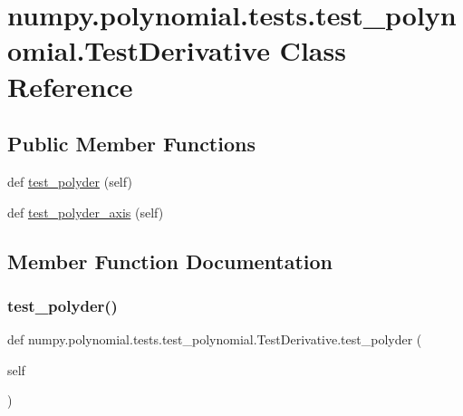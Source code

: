 \hypertarget{classnumpy_1_1polynomial_1_1tests_1_1test__polynomial_1_1TestDerivative}{}\section{numpy.\+polynomial.\+tests.\+test\+\_\+polynomial.\+Test\+Derivative Class Reference}
\label{classnumpy_1_1polynomial_1_1tests_1_1test__polynomial_1_1TestDerivative}
\subsection*{Public Member Functions}
\begin{DoxyCompactItemize}
\item 
def \hyperlink{classnumpy_1_1polynomial_1_1tests_1_1test__polynomial_1_1TestDerivative_a354de6ade4e1e06b1ea47fa1653047f7}{test\+\_\+polyder} (self)
\item 
def \hyperlink{classnumpy_1_1polynomial_1_1tests_1_1test__polynomial_1_1TestDerivative_ac707d0f7c6abafc5574dfee26f7a755e}{test\+\_\+polyder\+\_\+axis} (self)
\end{DoxyCompactItemize}


\subsection{Member Function Documentation}
\mbox{\label{classnumpy_1_1polynomial_1_1tests_1_1test__polynomial_1_1TestDerivative_a354de6ade4e1e06b1ea47fa1653047f7}} 
\subsubsection{\texorpdfstring{test\+\_\+polyder()}{test\_polyder()}}
{\footnotesize\ttfamily def numpy.\+polynomial.\+tests.\+test\+\_\+polynomial.\+Test\+Derivative.\+test\+\_\+polyder (\begin{DoxyParamCaption}\item[{}]{self }\end{DoxyParamCaption})}

